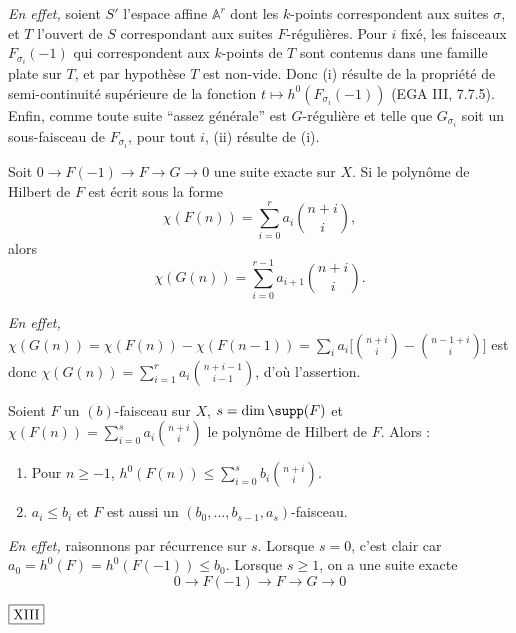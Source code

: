 \noindent\textit{En effet,} soient $S'$ l'espace affine $\mathbb{A}^r$ dont les $k$-points correspondent aux suites $\sigma$, et $T$ l'ouvert de $S$ correspondant aux suites $F$-régulières. Pour $i$ fixé, les faisceaux $F_{\sigma_i}(-1)$ qui correspondent aux $k$-points de $T$ sont contenus dans une famille plate sur $T$, et par hypothèse $T$ est non-vide. Donc (i) résulte de la propriété de semi-continuité supérieure de la fonction $t \mapsto h^0(F_{\sigma_i}(-1))$ (EGA III, 7.7.5). Enfin, comme toute suite ``assez générale'' est $G$-régulière et telle que $G_{\sigma_i}$ soit un sous-faisceau de $F_{\sigma_i}$, pour tout $i$, (ii) résulte de (i).

\begin{lem}\label{lem:1.7} Soit $0 \to F(-1) \to F \to G \to 0$ une suite exacte sur $X$. Si le polynôme de Hilbert de $F$ est écrit sous la forme
\[
\chi(F(n)) = \sum_{i=0}^{r} a_i \binom{n+i}{i},
\]
alors
\[
\chi(G(n)) = \sum_{i=0}^{r-1} a_{i+1} \binom{n+i}{i}.
\]
\end{lem}

\noindent\textit{En effet,} $\chi(G(n)) = \chi(F(n)) - \chi(F(n-1)) = \sum_i a_i \bigl[\binom{n+i}{i} - \binom{n-1+i}{i}\bigr]$ est donc $\chi(G(n)) = \sum_{i=1}^{r} a_i \binom{n+i-1}{i-1}$, d'où l'assertion.

\begin{prop}\label{prop:1.8} Soient $F$ un $(b)$-faisceau sur $X$, $s = \dim \supp(F)$ et $\chi(F(n)) = \sum_{i=0}^{s} a_i \binom{n+i}{i}$ le polynôme de Hilbert de $F$. Alors :
\begin{enumerate}[label={\roman*)}]
\item Pour $n \geq -1$, $h^0(F(n)) \leq \sum_{i=0}^{s} b_i \binom{n+i}{i}$.
\item $a_i \leq b_i$ et $F$ est aussi un $(b_0, \ldots, b_{s-1}, a_s)$-faisceau.
\end{enumerate}
\end{prop}

\noindent\textit{En effet,} raisonnons par récurrence sur $s$. Lorsque $s=0$, c'est clair car $a_0 = h^0(F) = h^0(F(-1)) \leq b_0$. Lorsque $s \geq 1$, on a une suite exacte
\[
0 \to F(-1) \to F \to G \to 0
\]

\begin{flushright}
$\fbox{\text{XIII}}$
\end{flushright}

